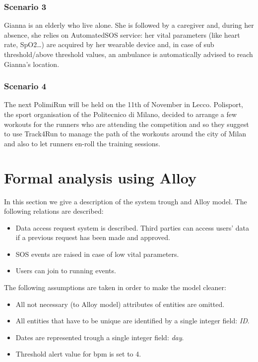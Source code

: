 \documentclass{article}
\begin{document}
	\subsubsection{Scenario 3}
	Gianna is an elderly who live alone. She is followed by a 
	caregiver and, during her absence,  she relies on AutomatedSOS 
	service: her vital parameters (like heart rate, SpO2…) 
	are acquired by her wearable device and, in case of
	sub threshold/above threshold values, an ambulance is 
	automatically advised to reach Gianna’s location. 

	\subsubsection{Scenario 4}
	The next PolimiRun will be held on the 11th of November in Lecco.
	Polisport, the sport organisation of the Politecnico di Milano, 
	decided to arrange a few workouts for the runners who are 
	attending the competition and so they suggest to use Track4Run to
	manage the path of the workouts around the city of Milan and also
	to let runners en-roll the training sessions. 

\newpage
\section{Formal analysis using Alloy}

In this section we give a description of the system trough and Alloy model.
The following relations are described:
\begin{itemize}
	\item Data access request system is described. Third parties can access users' data
		if a previous request has been made and approved.
	\item SOS events are raised in case of low vital parameters.
	\item Users can join to running events.
\end{itemize}
The following assumptions are taken in order to make the model cleaner:
\begin{itemize}
	\item All not necessary (to Alloy model) attributes of entities are omitted.
	\item All entities that have to be unique are identified by a single integer field: \textit{ID}.
	\item Dates are represented trough a single integer field: \textit{day}.
	\item Threshold alert value for bpm is set to 4.
\end{itemize}
\newpage

\newpage
\end{document}
